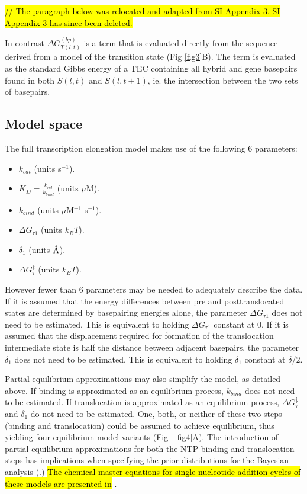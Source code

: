 \documentclass[10pt,letterpaper]{article}
\newcommand{\angstrom}{\mbox{\normalfont\AA}}
\begin{document}
\textcolor{red}{\hl{// The paragraph below was relocated and adapted from SI Appendix 3. SI Appendix 3 has since been deleted.}}


In contrast $\Delta G_{T(l,t)}^{(bp)}$ is a term that is evaluated directly from the sequence derived from a model of the transition state (Fig \ref{fig3}B). The term is evaluated as the standard Gibbs energy of a TEC containing all hybrid and gene basepairs found in both $S(l,t)$ and $S(l,t+1)$, ie. the intersection between the two sets of basepairs.








\subsection*{Model space}

The full transcription elongation model makes use of the following 6 parameters:

\begin{itemize}
\item $k_{cat}$ (units s$^{-1}$).
\item $K_D = \frac{k_{rel}}{k_{bind}}$ (units $\mu$M).
\item $k_{bind}$ (units $\mu$M$^{-1}$ s$^{-1}$).
\item $\Delta G_{\tau 1}$ (units $k_BT$).
\item $\delta_1$ (units $\angstrom$).
\item $\Delta G^\ddag_{\tau}$ (units $k_BT$).
\end{itemize}


However fewer than 6 parameters may be needed to adequately describe the data. If it is assumed that the energy differences between pre and posttranslocated states are determined by basepairing energies alone, the parameter $\Delta G_{\tau 1}$ does not need to be estimated. This is equivalent to holding $\Delta G_{\tau 1}$ constant at 0. If it is assumed that the displacement required for formation of the translocation intermediate state is half the distance between adjacent basepairs, the parameter $\delta_1$ does not need to be estimated. This is equivalent to holding $\delta_1$ constant at $\delta/2$.

Partial equilibrium approximations may also simplify the model, as detailed above. If binding is approximated as an equilibrium process, $k_{bind}$ does not need to be estimated. If translocation is approximated as an equilibrium process,  $\Delta G^\ddag_{\tau}$ and $\delta_1$ do not need to be estimated. One, both, or neither of these two steps (binding and translocation) could be assumed to achieve equilibrium, thus yielding four equilibrium model variants (Fig ~\ref{fig4}A). The introduction of partial equilibrium approximations for both the NTP binding and translocation steps has implications when specifying the prior distributions for the Bayesian analysis (.)
 \hl{The chemical master equations for single nucleotide addition cycles of these models are presented in} . \\
\end{document}
